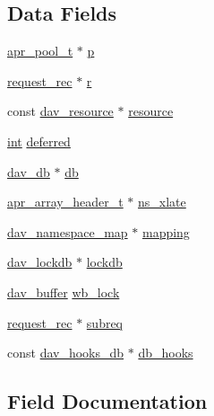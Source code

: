 \subsection*{Data Fields}
\begin{DoxyCompactItemize}
\item 
\hyperlink{structapr__pool__t}{apr\+\_\+pool\+\_\+t} $\ast$ \hyperlink{structdav__propdb_a6973ecc8f81aff87c31f924840e492b7}{p}
\item 
\hyperlink{structrequest__rec}{request\+\_\+rec} $\ast$ \hyperlink{structdav__propdb_a72ed02c6c1e4c31ec9dba21e391aa455}{r}
\item 
const \hyperlink{structdav__resource}{dav\+\_\+resource} $\ast$ \hyperlink{structdav__propdb_ae1c59a594efb948fc6ba0a046ad336c1}{resource}
\item 
\hyperlink{pcre_8txt_a42dfa4ff673c82d8efe7144098fbc198}{int} \hyperlink{structdav__propdb_a5fc44d255b4349337a30308e3dd22ed2}{deferred}
\item 
\hyperlink{structdav__db}{dav\+\_\+db} $\ast$ \hyperlink{structdav__propdb_a49ea8f1bcbc105b8ce0b9b79707cb2d7}{db}
\item 
\hyperlink{structapr__array__header__t}{apr\+\_\+array\+\_\+header\+\_\+t} $\ast$ \hyperlink{structdav__propdb_a346b1730a214b26be55c8ce1124ce16b}{ns\+\_\+xlate}
\item 
\hyperlink{structdav__namespace__map}{dav\+\_\+namespace\+\_\+map} $\ast$ \hyperlink{structdav__propdb_a28383422023a9d7f3407c3a19138fd37}{mapping}
\item 
\hyperlink{structdav__lockdb}{dav\+\_\+lockdb} $\ast$ \hyperlink{structdav__propdb_af6bc223f74019af9d86189737b3b59b9}{lockdb}
\item 
\hyperlink{structdav__buffer}{dav\+\_\+buffer} \hyperlink{structdav__propdb_ae8338e47ac1fa8762b2f8b2bfcd022fe}{wb\+\_\+lock}
\item 
\hyperlink{structrequest__rec}{request\+\_\+rec} $\ast$ \hyperlink{structdav__propdb_a108cc520adb4f918650767354a355384}{subreq}
\item 
const \hyperlink{group__MOD__DAV_gafb40434fe70df3d6b814d00757680507}{dav\+\_\+hooks\+\_\+db} $\ast$ \hyperlink{structdav__propdb_a1e52f1dc673f63827c00e13a651329f3}{db\+\_\+hooks}
\end{DoxyCompactItemize}


\subsection{Field Documentation}
